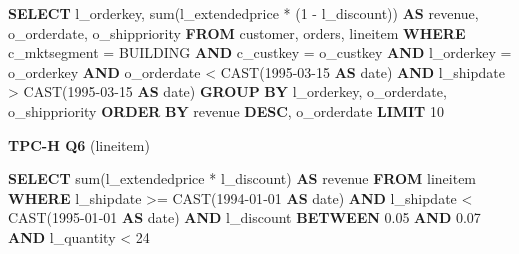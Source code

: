 \documentclass[
  10pt,
]{article}
\newenvironment{Shaded}{}{}
\newcommand{\DataTypeTok}[1]{\textcolor[rgb]{0.56,0.13,0.00}{#1}}
\newcommand{\DecValTok}[1]{\textcolor[rgb]{0.25,0.63,0.44}{#1}}
\newcommand{\FloatTok}[1]{\textcolor[rgb]{0.25,0.63,0.44}{#1}}
\newcommand{\FunctionTok}[1]{\textcolor[rgb]{0.02,0.16,0.49}{#1}}
\newcommand{\KeywordTok}[1]{\textcolor[rgb]{0.00,0.44,0.13}{\textbf{#1}}}
\newcommand{\NormalTok}[1]{#1}
\newcommand{\OperatorTok}[1]{\textcolor[rgb]{0.40,0.40,0.40}{#1}}
\newcommand{\StringTok}[1]{\textcolor[rgb]{0.25,0.44,0.63}{#1}}
\begin{document}
\begin{Shaded}
\begin{Highlighting}[]
\KeywordTok{SELECT}
\NormalTok{    l\_orderkey,}
    \FunctionTok{sum}\NormalTok{(l\_extendedprice }\OperatorTok{*}\NormalTok{ (}\DecValTok{1} \OperatorTok{{-}}\NormalTok{ l\_discount)) }\KeywordTok{AS}\NormalTok{ revenue,}
\NormalTok{    o\_orderdate,}
\NormalTok{    o\_shippriority}
\KeywordTok{FROM}
\NormalTok{    customer,}
\NormalTok{    orders,}
\NormalTok{    lineitem}
\KeywordTok{WHERE}
\NormalTok{    c\_mktsegment }\OperatorTok{=} \StringTok{\textquotesingle{}BUILDING\textquotesingle{}}
    \KeywordTok{AND}\NormalTok{ c\_custkey }\OperatorTok{=}\NormalTok{ o\_custkey}
    \KeywordTok{AND}\NormalTok{ l\_orderkey }\OperatorTok{=}\NormalTok{ o\_orderkey}
    \KeywordTok{AND}\NormalTok{ o\_orderdate }\OperatorTok{\textless{}} \FunctionTok{CAST}\NormalTok{(}\StringTok{\textquotesingle{}1995{-}03{-}15\textquotesingle{}} \KeywordTok{AS} \DataTypeTok{date}\NormalTok{)}
    \KeywordTok{AND}\NormalTok{ l\_shipdate }\OperatorTok{\textgreater{}} \FunctionTok{CAST}\NormalTok{(}\StringTok{\textquotesingle{}1995{-}03{-}15\textquotesingle{}} \KeywordTok{AS} \DataTypeTok{date}\NormalTok{)}
\KeywordTok{GROUP} \KeywordTok{BY}
\NormalTok{    l\_orderkey,}
\NormalTok{    o\_orderdate,}
\NormalTok{    o\_shippriority}
\KeywordTok{ORDER} \KeywordTok{BY}
\NormalTok{    revenue }\KeywordTok{DESC}\NormalTok{,}
\NormalTok{    o\_orderdate}
\KeywordTok{LIMIT} \DecValTok{10}
\end{Highlighting}
\end{Shaded}

\textbf{TPC-H Q6} (lineitem)

\begin{Shaded}
\begin{Highlighting}[]
\KeywordTok{SELECT}
    \FunctionTok{sum}\NormalTok{(l\_extendedprice }\OperatorTok{*}\NormalTok{ l\_discount) }\KeywordTok{AS}\NormalTok{ revenue}
\KeywordTok{FROM}
\NormalTok{    lineitem}
\KeywordTok{WHERE}
\NormalTok{    l\_shipdate }\OperatorTok{\textgreater{}=} \FunctionTok{CAST}\NormalTok{(}\StringTok{\textquotesingle{}1994{-}01{-}01\textquotesingle{}} \KeywordTok{AS} \DataTypeTok{date}\NormalTok{)}
    \KeywordTok{AND}\NormalTok{ l\_shipdate }\OperatorTok{\textless{}} \FunctionTok{CAST}\NormalTok{(}\StringTok{\textquotesingle{}1995{-}01{-}01\textquotesingle{}} \KeywordTok{AS} \DataTypeTok{date}\NormalTok{)}
    \KeywordTok{AND}\NormalTok{ l\_discount }\KeywordTok{BETWEEN} \FloatTok{0.05}
    \KeywordTok{AND} \FloatTok{0.07}
    \KeywordTok{AND}\NormalTok{ l\_quantity }\OperatorTok{\textless{}} \DecValTok{24}
\end{Highlighting}
\end{Shaded}
\end{document}
